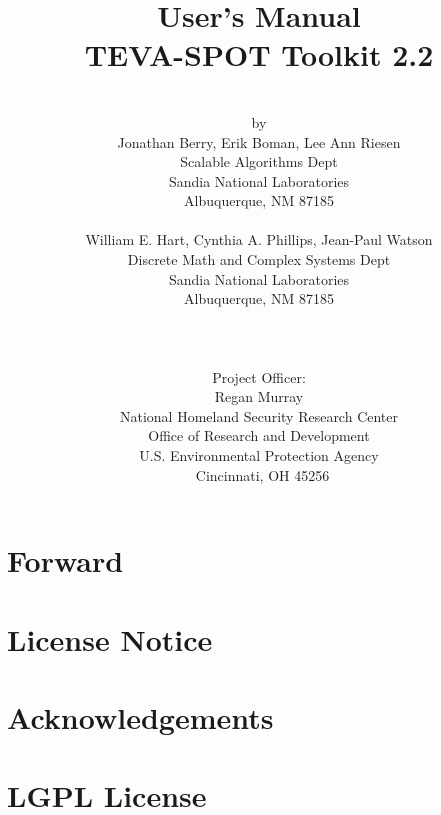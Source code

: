\documentclass[pdf,report]{EPAmanual}
\title{\sc User's Manual\\TEVA-SPOT Toolkit 2.2}
\author{\\by\\
Jonathan Berry, Erik Boman, Lee Ann Riesen\\
Scalable Algorithms Dept\\
Sandia National Laboratories\\
Albuquerque, NM 87185\\
\mbox{}\\
William E. Hart, Cynthia A. Phillips, Jean-Paul Watson\\
Discrete Math and Complex Systems Dept\\
Sandia National Laboratories\\
Albuquerque, NM 87185\\
    \\\\\\
    Project Officer:\\
    \sc Regan Murray\\
    \sc National Homeland Security Research Center\\
    \sc Office of Research and Development\\
    \sc U.S. Environmental Protection Agency\\\
    \sc Cincinnati, OH 45256
  }
\date{}
\begin{document}
  \maketitle

  \clearpage
  
  
  \clearpage
  \chapter*{Forward}
  

  \clearpage
  \chapter*{License Notice}
  

  \clearpage
  \chapter*{Acknowledgements}
  

  \cleardoublepage
  \tableofcontents

  \SANDmain



\newpage




\newpage

\appendix



\chapter{LGPL License}\label{LGPLPage}


  
\end{document}
